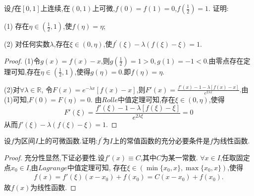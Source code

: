 \documentclass[lang=cn,newtx,10pt,scheme=chinese]{../Template/elegantbook}
\begin{document}
\begin{exercise}
    设\(f\)在\([0,1]\)上连续,在\((0,1)\)上可微,\(f(0)=f(1)=0\),\(f(\frac{1}{2})=1\).
    证明:
    
    (1) 存在\(\eta\in(\frac{1}{2},1)\),使\(f(\eta)=\eta\);
    
    (2) 对任何实数\(\lambda\),存在\(\xi\in(0,\eta)\),使\(f^{\prime}(\xi)-\lambda(f(\xi)-\xi)=1\).
    \begin{proof}
    (1)令$g(x)=f(x)-x$,则$g(\frac{1}{2})=1>0,g(1)=-1<0$.由零点存在定理可知,存在$\eta\in(\frac{1}{2},1)$,使得$g(\eta)=0$.即$f(\eta)=\eta$.

    (2)对$\forall \lambda\in \mathbb{R}$,
    令$F(x)=e^{-\lambda x}[f(x)-x]$,则$F'(x)=\frac{f'(x)-1-\lambda[f(x)-x]}{e^{2\lambda x}}$.由(1)可知,$F(0)=F(\eta)=0$.
    由$Rolle$中值定理可知,存在$\xi\in(0,\eta)$,使得
    \begin{equation}
    F'(\xi)=\frac{f'(\xi)-1-\lambda[f(\xi)-\xi]}{e^{2\lambda \xi}}=0
        \nonumber
    \end{equation}
    从而$f'(\xi)-\lambda(f(\xi)-\xi)=1$.
    
\end{proof}
\end{exercise}

\begin{exercise}
设\(f\)为区间\(I\)上的可微函数.证明:\(f^{\prime}\)为\(I\)上的常值函数的充分必要条件是\(f\)为线性函数.
\end{exercise}
\begin{proof}
充分性显然,下证必要性.设$f'(x)\equiv C$,其中$C$为某一常数.
$\forall x\in I$,任取固定点$x_0\in I$,由$Lagrange$中值定理可知,
存在$\xi\in(\min\{x_0,x\},\max\{x_0,x\})$,使得
\begin{align*}
f(x)=f'(\xi)(x-x_0)+f(x_0)=C(x-x_0)+f(x_0).
\end{align*}
故$f(x)$为线性函数.

\end{proof}
\end{document}
